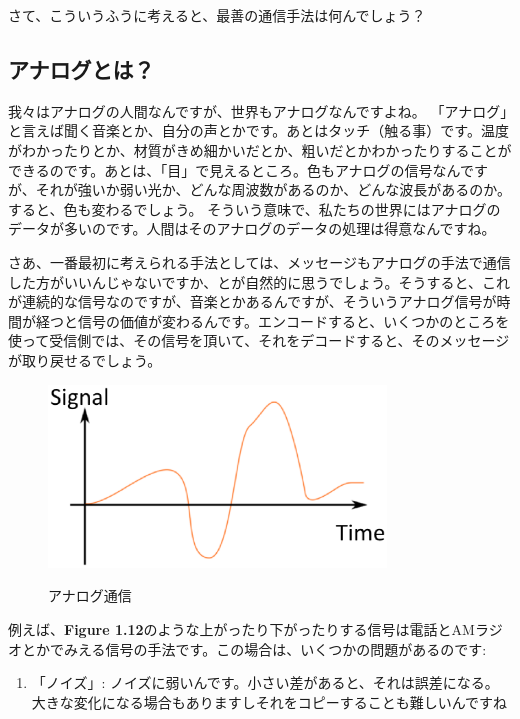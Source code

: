さて、こういうふうに考えると、最善の通信手法は何んでしょう？
\subsection{アナログとは？}

我々はアナログの人間なんですが、世界もアナログなんですよね。
「アナログ」と言えば聞く音楽とか、自分の声とかです。あとはタッチ（触る事）です。温度がわかったりとか、材質がきめ細かいだとか、粗いだとかわかったりすることができるのです。あとは、「目」で見えるところ。色もアナログの信号なんですが、それが強いか弱い光か、どんな周波数があるのか、どんな波長があるのか。すると、色も変わるでしょう。
そういう意味で、私たちの世界にはアナログのデータが多いのです。人間はそのアナログのデータの処理は得意なんですね。


さあ、一番最初に考えられる手法としては、メッセージもアナログの手法で通信した方がいいんじゃないですか、とが自然的に思うでしょう。そうすると、これが連続的な信号なのですが、音楽とかあるんですが、そういうアナログ信号が時間が経つと信号の価値が変わるんです。エンコードすると、いくつかのところを使って受信側では、その信号を頂いて、それをデコードすると、そのメッセージが取り戻せるでしょう。

\begin{figure}[H]
    \includegraphics[width=0.8\textwidth]{lesson1/continuoussignal.eps}
    \label{fig: 1}
    \caption{アナログ通信}
\end{figure}

例えば、\textbf{Figure 1.12}のような上がったり下がったりする信号は電話とAMラジオとかでみえる信号の手法です。この場合は、いくつかの問題があるのです:
\begin{enumerate}
    \item 「ノイズ」: ノイズに弱いんです。小さい差があると、それは誤差になる。大きな変化になる場合もありますしそれをコピーすることも難しいんですね
\end{enumerate}

